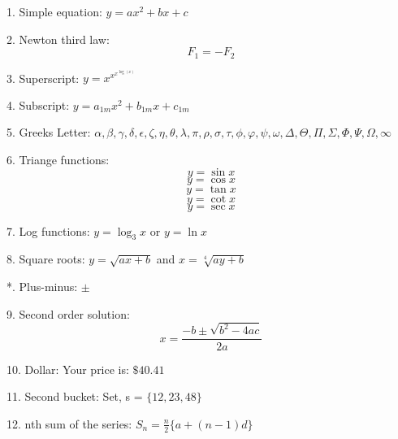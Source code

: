 \documentclass[11pt]{article}
\begin{document}
1. Simple equation: $y = ax^2 + bx + c$

2. Newton third law: $$F_1 = -F_2$$

3. Superscript: $y = x^{x^{x^{\log(x)}}}$

4. Subscript: $y = a_{1m}x^2+b_{1m}x+c_{1m}$

5. Greeks Letter: $\alpha, \beta, \gamma, \delta, \epsilon, \zeta, \eta, \theta, \lambda, \pi, \rho, \sigma, \tau, \phi, \varphi, \psi, \omega, \Delta, \Theta, \Pi, \Sigma, \Phi, \Psi, \Omega, \infty$

6. Triange functions: $$y = \sin{x}$$
					  $$y = \cos{x}$$
					  $$y = \tan{x}$$
					  $$y = \cot{x}$$
					  $$y = \sec{x}$$
					  
7. Log functions: $y = \log_3{x}$ or $y = \ln{x}$

8. Square roots: $y = \sqrt{ax + b}$ and $x = \sqrt[4]{ay + b}$

*. Plus-minus: $\pm$

9. Second order solution: $$x = \frac{-b \pm \sqrt{b^2 - 4ac}}{2a}$$

10. Dollar: Your price is: $\$40.41$

11. Second bucket: Set, s = $\{12, 23, 48\}$

12. nth sum of the series: $S_n = \displaystyle{\frac{n}{2}}\{a + (n - 1)d\}$
\end{document}

